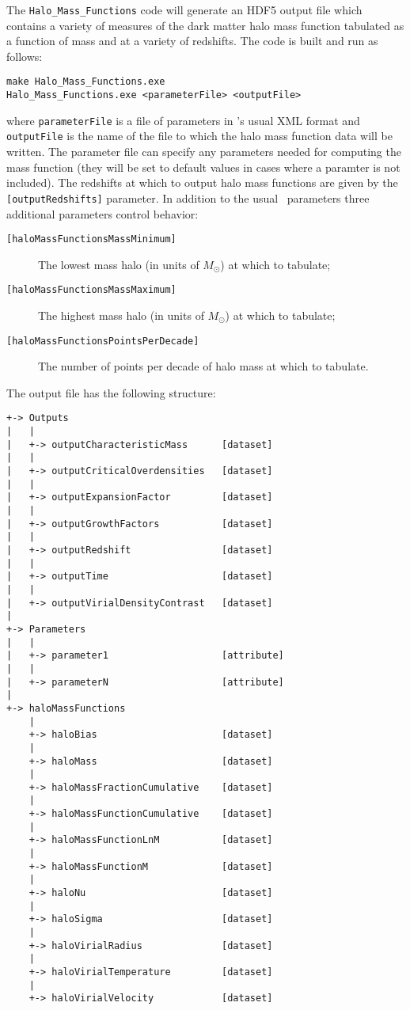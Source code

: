 The {\tt Halo\_Mass\_Functions} code will generate an HDF5 output file which contains a variety of measures of the dark matter halo mass function tabulated as a function of mass and at a variety of redshifts. The code is built and run as follows:
\begin{verbatim}
make Halo_Mass_Functions.exe
Halo_Mass_Functions.exe <parameterFile> <outputFile>
\end{verbatim}
where {\tt parameterFile} is a file of parameters in \glc's usual XML format and {\tt outputFile} is the name of the file to which the halo mass function data will be written. The parameter file can specify any parameters needed for computing the mass function (they will be set to default values in cases where a paramter is not included). The redshifts at which to output halo mass functions are given by the {\tt [outputRedshifts]} parameter. In addition to the usual \glc\ parameters three additional parameters control behavior:
\begin{description}
\item [{\tt [haloMassFunctionsMassMinimum]}] The lowest mass halo (in units of $M_\odot$) at which to tabulate;
\item [{\tt [haloMassFunctionsMassMaximum]}] The highest mass halo (in units of $M_\odot$) at which to tabulate;
\item [{\tt [haloMassFunctionsPointsPerDecade]}] The number of points per decade of halo mass at which to tabulate.
\end{description}
The output file has the following structure:
\begin{verbatim}
+-> Outputs
|   |
|   +-> outputCharacteristicMass      [dataset]
|   |
|   +-> outputCriticalOverdensities   [dataset]
|   |
|   +-> outputExpansionFactor         [dataset]
|   |
|   +-> outputGrowthFactors           [dataset]
|   |
|   +-> outputRedshift                [dataset]
|   |
|   +-> outputTime                    [dataset]
|   |
|   +-> outputVirialDensityContrast   [dataset]
|    
+-> Parameters
|   |
|   +-> parameter1                    [attribute]
|   |
|   +-> parameterN                    [attribute]
|    
+-> haloMassFunctions
    |
    +-> haloBias                      [dataset]
    |
    +-> haloMass                      [dataset]
    |
    +-> haloMassFractionCumulative    [dataset]
    |
    +-> haloMassFunctionCumulative    [dataset]
    |
    +-> haloMassFunctionLnM           [dataset]
    |
    +-> haloMassFunctionM             [dataset]
    |
    +-> haloNu                        [dataset]
    |
    +-> haloSigma                     [dataset]
    |
    +-> haloVirialRadius              [dataset]
    |
    +-> haloVirialTemperature         [dataset]
    |
    +-> haloVirialVelocity            [dataset]
\end{verbatim}
